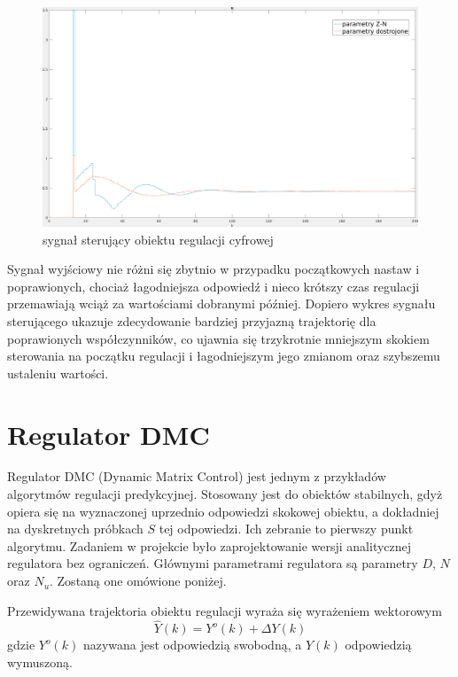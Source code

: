 \documentclass[fleqn]{article}
\begin{document}
\begin{figure}[H]
	\includegraphics[width=\textwidth]{scripts/dyskretster.png}
	\caption{sygnał sterujący obiektu regulacji cyfrowej}
\end{figure}

Sygnał wyjściowy nie różni się zbytnio w przypadku początkowych nastaw i poprawionych, chociaż łagodniejsza odpowiedź i nieco krótszy czas regulacji przemawiają wciąż za wartościami dobranymi później. Dopiero wykres sygnału sterującego ukazuje zdecydowanie bardziej przyjazną trajektorię dla poprawionych współczynników, co ujawnia się trzykrotnie mniejszym skokiem sterowania na początku regulacji i łagodniejszym jego zmianom oraz szybszemu ustaleniu wartości.

\section{Regulator DMC}

Regulator DMC (Dynamic Matrix Control) jest jednym z przykładów algorytmów regulacji predykcyjnej. Stosowany jest do obiektów stabilnych, gdyż opiera się na wyznaczonej uprzednio odpowiedzi skokowej obiektu, a dokładniej na dyskretnych próbkach $S$ tej odpowiedzi. Ich zebranie to pierwszy punkt algorytmu. Zadaniem w projekcie było zaprojektowanie wersji analitycznej regulatora bez ograniczeń. Głównymi parametrami regulatora są parametry $D$, $N$ oraz $N_u$. Zostaną one omówione poniżej.

Przewidywana trajektoria obiektu regulacji wyraża się wyrażeniem wektorowym
{\Large
\begin{equation}
	\hat{Y}(k) = Y^o(k)+\Delta Y(k)
\end{equation}
}
gdzie $Y^o(k)$ nazywana jest odpowiedzią swobodną, a $Y(k)$ odpowiedzią wymuszoną.
\end{document}
